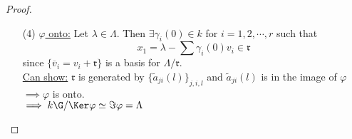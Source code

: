 \begin{thm}
\begin{proof}
\begin{enumerate}
\begin{enumerate}
\item[(4)] \underline{$\varphi$ onto:} Let $\lambda \in \Lambda$. Then $\exists \gamma_i(0) \in k$ for $i = 1, 2, \cdots , r$ such that \[ x_1 = \lambda - \sum \gamma_i(0)v_i \in \mathfrak{r} \]
since $\{ \overline{v}_i = v_i + \mathfrak{r} \}$ is a basis for $\Lambda/\mathfrak{r}$.\\
\underline{Can show:} $\mathfrak{r}$ is generated by $\{ \tilde{a}_{ji}(l) \}_{j,i,l}$ and $\tilde{a}_{ji}(l)$ is in the image of $\varphi$ $\implies \varphi$ is onto.\\
$\implies k\G/ \Ker \varphi \simeq \Im \varphi = \Lambda$
\end{enumerate}
\end{enumerate}
\end{proof}
\end{thm}

